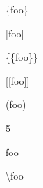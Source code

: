 
\def\mytitle{Special Characters}


\{foo\}

[foo]

\{\{foo\}\}

[[foo]]

(foo)

5

\textbar{}foo\textbar{}

\textbackslash{}foo



